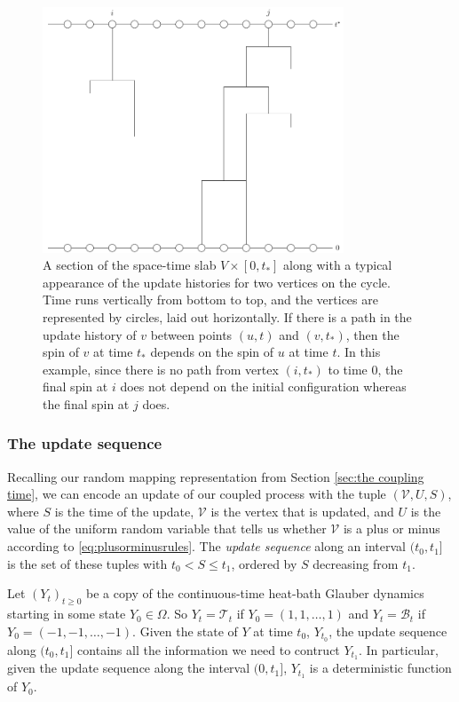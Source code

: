 	\begin{figure}
		\centering
		\includegraphics[width = 0.8\textwidth]{Figures/IsingCouplingTime/typical_percolation.pdf}
		\caption[Typical appearance of the update histories for two vertices on the cycle]{A section of the space-time slab $V \times [0, t_*]$ along with a typical appearance of the update histories for two vertices on the cycle. Time runs vertically from bottom to top, and the vertices are represented by circles, laid out horizontally. If there is a path in the update history of $v$ between points $(u, t)$ and $(v, t_*)$, then the spin of $v$ at time $t_*$ depends on the spin of $u$ at time $t$. In this example, since there is no path from vertex $(i, t_*)$ to time $0$, the final spin at $i$ does not depend on the initial configuration whereas the final spin at $j$ does.}
		\label{fig:typical percolation}
	\end{figure}

	\subsubsection{The update sequence}
	Recalling our random mapping representation from Section \ref{sec:the coupling time}, we can encode an update of our coupled process with the tuple $(\mathcal{V}, U, S)$, where $S$ is the time of the update, $\mathcal{V}$ is the vertex that is updated, and $U$ is the value of the uniform random variable that tells us whether $\mathcal{V}$ is a plus or minus according to \eqref{eq:plusorminusrules}. The \emph{update sequence} along an interval $(t_0, t_1]$ is the set of these tuples with $t_0 < S \leq t_1$, ordered by $S$ decreasing from $t_1$. 

	Let $(Y_t)_{t \geq 0}$ be a copy of the continuous-time heat-bath Glauber dynamics starting in some state $Y_0 \in \Omega$. So $Y_t = \mathscr{T}_t$ if $Y_0 = (1, 1, \dots, 1)$ and $Y_t = \mathscr{B}_t$ if $Y_0 = (-1, -1, \dots, -1)$. Given the state of $Y$ at time $t_0$, $Y_{t_0}$, the update sequence along $(t_0, t_1]$ contains all the information we need to contruct $Y_{t_1}$. In particular, given the update sequence along the interval $(0, t_1]$, $Y_{t_1}$ is a deterministic function of $Y_0$.

